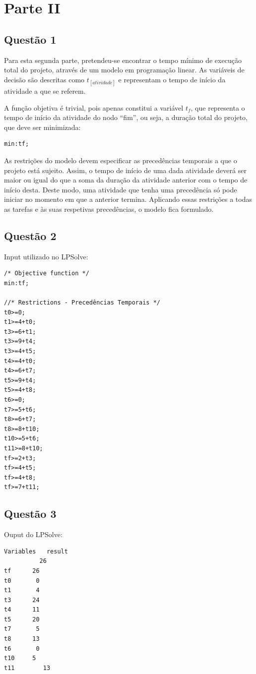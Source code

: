 \documentclass[11pt,titlepage,contentspage,a4paper]{article} %
\begin{document}
 
\section{Parte II}
\subsection{Questão 1}

Para esta segunda parte, pretendeu-se encontrar o tempo mínimo de execução total do projeto, através de um modelo em programação linear. As variáveis de decisão são descritas como $t_{[atividade]}$ e representam o tempo de início da atividade a que se referem.  

A função objetiva é trivial, pois apenas constitui a variável $t_f$, que representa o tempo de início da atividade do nodo “fim”, ou seja, a duração total do projeto, que deve ser minimizada:	
\begin{Verbatim}[frame=single]
min:tf;
\end{Verbatim}
				
As restrições do modelo devem especificar as precedências temporais a que o projeto está sujeito. Assim, o tempo de início de uma dada atividade deverá ser maior ou igual do que a soma da duração da atividade anterior com o tempo de início desta. Deste modo, uma atividade que tenha uma precedência só pode iniciar no momento em que a anterior termina. Aplicando essas restrições a todas as tarefas e às suas respetivas precedências, o modelo fica formulado.


\subsection{Questão 2}
Input utilizado no LPSolve:
\begin{Verbatim}[frame=single]
/* Objective function */
min:tf;

//* Restrictions - Precedências Temporais */
t0>=0;
t1>=4+t0;
t3>=6+t1;
t3>=9+t4;
t3>=4+t5;
t4>=4+t0;
t4>=6+t7;
t5>=9+t4;
t5>=4+t8;
t6>=0;
t7>=5+t6;
t8>=6+t7;
t8>=8+t10;
t10>=5+t6;
t11>=8+t10;
tf>=2+t3;
tf>=4+t5;
tf>=4+t8;
tf>=7+t11;
\end{Verbatim}


\subsection{Questão 3}
Ouput do LPSolve:
\begin{Verbatim}[frame=single]
Variables	result
		  26
tf		26
t0		 0
t1		 4
t3		24
t4		11
t5		20
t7		 5
t8		13
t6		 0
t10		5
t11	       13
\end{Verbatim}
\end{document}
